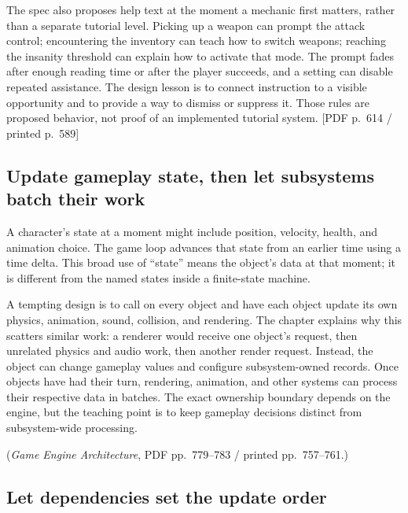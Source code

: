 The spec also proposes help text at the moment a mechanic first matters, rather than a separate tutorial level. Picking up a weapon can prompt the attack control; encountering the inventory can teach how to switch weapons; reaching the insanity threshold can explain how to activate that mode. The prompt fades after enough reading time or after the player succeeds, and a setting can disable repeated assistance. The design lesson is to connect instruction to a visible opportunity and to provide a way to dismiss or suppress it. Those rules are proposed behavior, not proof of an implemented tutorial system. {[}PDF p.~614 / printed p.~589{]}

\subsection{Update gameplay state, then let subsystems batch their work}\label{05-engine-i-ch014-update-gameplay-state-then-let-subsystems-batch-their-work}

\hypertarget{05-engine-i-ch014-update-gameplay-state-then-let-subsystems-batch-their-work}{}

A character's state at a moment might include position, velocity, health, and animation choice. The game loop advances that state from an earlier time using a time delta. This broad use of ``state'' means the object's data at that moment; it is different from the named states inside a finite-state machine.

A tempting design is to call  on every object and have each object update its own physics, animation, sound, collision, and rendering. The chapter explains why this scatters similar work: a renderer would receive one object's request, then unrelated physics and audio work, then another render request. Instead, the object can change gameplay values and configure subsystem-owned records. Once objects have had their turn, rendering, animation, and other systems can process their respective data in batches. The exact ownership boundary depends on the engine, but the teaching point is to keep gameplay decisions distinct from subsystem-wide processing.

(\emph{Game Engine Architecture}, PDF pp.~779--783 / printed pp.~757--761.)

\subsection{Let dependencies set the update order}\label{05-engine-i-ch014-let-dependencies-set-the-update-order}

